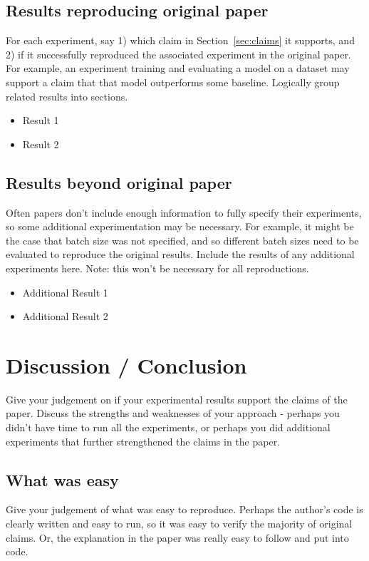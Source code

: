 \documentclass[10pt]{article} %
\begin{document}
	
	\subsection{Results reproducing original paper}
	For each experiment, say 1) which claim in Section~\ref{sec:claims} it supports, and 2) if it successfully reproduced the associated experiment in the original paper. 
	For example, an experiment training and evaluating a model on a dataset may support a claim that that model outperforms some baseline.
	Logically group related results into sections. 
	
	\begin{itemize}
	\item{Result 1}
	\item{Result 2}
	\end{itemize} 
	
	\subsection{Results beyond original paper}
	Often papers don't include enough information to fully specify their experiments, so some additional experimentation may be necessary. For example, it might be the case that batch size was not specified, and so different batch sizes need to be evaluated to reproduce the original results. Include the results of any additional experiments here. Note: this won't be necessary for all reproductions.
	
	\begin{itemize}
	\item{Additional Result 1}
	\item{Additional Result 2}
	\end{itemize} 
	
	\section{Discussion / Conclusion}
	
	Give your judgement on if your experimental results support the claims of the paper. Discuss the strengths and weaknesses of your approach - perhaps you didn't have time to run all the experiments, or perhaps you did additional experiments that further strengthened the claims in the paper.
	
	\subsection{What was easy}
	Give your judgement of what was easy to reproduce. Perhaps the author's code is clearly written and easy to run, so it was easy to verify the majority of original claims. Or, the explanation in the paper was really easy to follow and put into code. 
	
\end{document}
